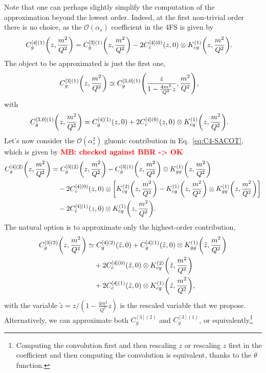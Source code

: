 \documentclass[a4paper,10pt]{article}
\newcommand{\zapp}{\tilde z}
\newcommand{\as}{\alpha_s}
\newcommand{\Ord}{\mathcal{O}}
\let\originalleft\left
\let\originalright\right
\renewcommand{\left}{\mathopen{}\mathclose\bgroup\originalleft}
\renewcommand{\right}{\aftergroup\egroup\originalright}
\def\({\left(}
\def\){\right)}
\def\[{\left[}
\def\]{\right]}
\newcommand{\MB}[1]{\textbf{\textcolor{red}   {MB: #1}}}
\begin{document}
Note that one can perhaps slightly simplify the computation of the approximation beyond the lowest order.
Indeed, at the first non-trivial order there is no choice, as the $\Ord(\as)$ coefficient in the 4FS is given by
\begin{align}\label{eq:C41}
C_g^{[4](1)}\(z,\frac{m^2}{Q^2}\)
&= C_g^{[3](1)}\(z,\frac{m^2}{Q^2}\) -2C_c^{[4](0)}(z,0)\otimes K_{cg}^{(1)}\(z,\frac{m^2}{Q^2}\).
\end{align}
The object to be approximated is just the first one,
\begin{align}
C_g^{[3](1)}\(z,\frac{m^2}{Q^2}\)
&\simeq C_g^{[3,0](1)}\(\frac{z}{1-\frac{4m^2}{Q^2}z},\frac{m^2}{Q^2}\),
\end{align}
with
\begin{align}
C_g^{[3,0](1)}\(z,\frac{m^2}{Q^2}\)
&= C_g^{[4](1)}\(z,0\) +2C_c^{[4](0)}(z,0)\otimes K_{cg}^{(1)}\(z,\frac{m^2}{Q^2}\).
\end{align}
Let's now consider the $\Ord(\as^2)$ gluonic contribution in Eq.~\eqref{eq:C4-SACOT},
which is given by \MB{checked against BBR -> OK}
\begin{align}\label{eq:C42}
C_g^{[4](2)}\(z,\frac{m^2}{Q^2}\)
&= C_g^{[3](2)}\(z,\frac{m^2}{Q^2}\)-C_g^{[3](1)}\(z,\frac{m^2}{Q^2}\)\otimes K_{gg}^{(1)}\(z,\frac{m^2}{Q^2}\)
\nonumber\\ &\quad
-2C_c^{[4](0)}(z,0)\otimes \[K_{cg}^{(2)}\(z,\frac{m^2}{Q^2}\)-K_{cg}^{(1)}\(z,\frac{m^2}{Q^2}\)\otimes K_{gg}^{(1)}\(z,\frac{m^2}{Q^2}\)\]
\nonumber\\ &\quad
-2C_c^{[4](1)}(z,0)\otimes K_{cg}^{(1)}\(z,\frac{m^2}{Q^2}\).
\end{align}
The natural option is to approximate only the highest-order contribution,
\begin{align}
C_g^{[3](2)}\(z,\frac{m^2}{Q^2}\)
&\simeq C_g^{[4](2)}\(\zapp,0\)+C_g^{[4](1)}\(\zapp,0\)\otimes K_{gg}^{(1)}\(\zapp,\frac{m^2}{Q^2}\)
\nonumber\\ &\quad
+2C_c^{[4](0)}(\zapp,0)\otimes K_{cg}^{(2)}\(\zapp,\frac{m^2}{Q^2}\)
\nonumber\\ &\quad
+2C_c^{[4](1)}(\zapp,0)\otimes K_{cg}^{(1)}\(\zapp,\frac{m^2}{Q^2}\),
\end{align}
with the variable $\zapp=z/(1-\frac{4m^2}{Q^2}z)$ is the rescaled variable that we propose.
Alternatively, we can approximate both $C_g^{[3](2)}$ and $C_g^{[3](1)}$, or equivalently\footnote
{Computing the convolution first and then rescaling $z$ or rescaling $z$ first in the coefficient and then computing the convolution
  is equivalent, thanks to the $\theta$ function.}
\end{document}
